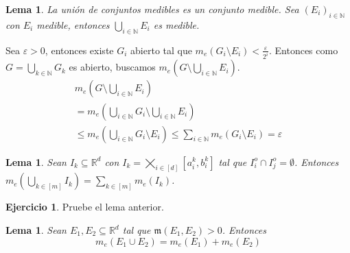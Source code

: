 \documentclass[12pt]{article}
\theoremstyle{plain}
\newtheorem{Lem}[Th]{Lema}             %
\theoremstyle{definition}
\newtheorem{Ej}[Th]{Ejercicio}
\theoremstyle{remark}
\numberwithin{equation}{section}
\newcommand{\bN}{\mathbb{N}}        %
\newcommand{\bR}{\mathbb{R}}        %
\newcommand{\mm}{\mathfrak{m}}      %
\renewcommand{\leq}{\leqslant}      %
\renewcommand{\:}{\colon}           %
\newcommand{\bonj}[1]{\left\lbrack#1\right\rbrack}
\begin{document}
\begin{multicols}{2}
\begin{Lem}
  La unión de conjuntos medibles es un conjunto medible. Sea $(E_i)_{i\in\bN}$ con $E_i$ medible, entonces $\bigcup_{i\in\bN}E_i$ es medible.
\end{Lem}

\begin{ptcbp}
Sea $\varepsilon>0$, entonces existe $G_i$ abierto tal que $m_e(G_i\setminus E_i)<\frac{\varepsilon}{2^i}$. Entonces como $G=\bigcup_{k\in\bN}G_k$ es abierto, buscamos $m_e(G\setminus\bigcup_{i\in\bN}E_i)$.
\begin{gather*}
  m_e\left(G\setminus\bigcup_{i\in\bN}E_i\right)\\
  =m_e\left(\bigcup_{i\in\bN}G_i\setminus\bigcup_{i\in\bN}E_i\right)\\
  \leq m_e\left(\bigcup_{i\in\bN}G_i\setminus E_i\right)\leq \sum_{i\in\bN}m_e(G_i\setminus E_i)=\varepsilon
\end{gather*}
\end{ptcbp}

\begin{Lem}
  Sean $I_k\subseteq\bR^d$ con $I_k=\bigtimes_{i\in\bonj{d}}\bonj{a_i^k,b_i^k}$ tal que $I_i^o\cap I_j^o=\emptyset$. Entonces $m_e(\bigcup_{k\in\bonj{m}}I_k)=\sum_{k\in\bonj{m}}m_e(I_k)$.
\end{Lem}

\begin{Ej}
  Pruebe el lema anterior.
\end{Ej}

\begin{Lem}\label{lem:medSeparaDistMayorACero}
  Sean $E_1,E_2\subseteq\bR^d$ tal que $\mm(E_1,E_2)>0$. Entonces
  $$m_e(E_1\cup E_2)=m_e(E_1)+m_e(E_2)$$
\end{Lem}

\begin{ptcbp}


\end{ptcbp}
\end{multicols}
\end{document}
